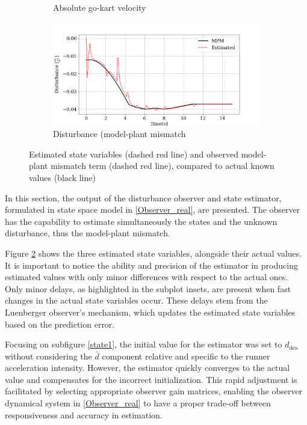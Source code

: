 \documentclass[a4paper,12pt,oneside]{book}
\begin{document}
\begin{figure}[h!]
\begin{subfigure}[b]{0.49\textwidth}
    \caption{Absolute go-kart velocity}
    \end{subfigure}
    \hfill
    \begin{subfigure}[b]{0.49\textwidth}
        \includegraphics[width=\textwidth]{Estimator/mpm.png}
    \caption{Disturbance (model-plant mismatch}
    \label{disturbance}
    \end{subfigure}
    \caption{Estimated state variables (dashed red line) and observed model-plant mismatch term (dashed red line), compared to actual known values (black line)}
\label{Estimator}
\end{figure}

In this section, the output of the disturbance observer and state estimator, formulated in state space model in \eqref{Observer_real}, are presented.
The observer has the capability to estimate simultaneously the states and the unknown disturbance, thus the model-plant mismatch.

Figure \ref{Estimator} shows the three estimated state variables, alongside their actual values.
It is important to notice the ability and precision of the estimator in producing estimated values with only minor differences with respect to the actual ones.
Only minor delays, as highlighted in the subplot insets, are present when fast changes in the actual state variables occur.
These delays stem from the Luenberger observer's mechanism, which updates the estimated state variables based on the prediction error.

Focusing on subfigure \ref{state1}, the initial value for the estimator was set to $d_\text{des}$ without considering the $\bar{d}$ component relative and specific to the runner acceleration intensity. 
However, the estimator quickly converges to the actual value and compensates for the incorrect initialization. 
This rapid adjustment is facilitated by selecting appropriate observer gain matrices, enabling the observer dynamical system in \eqref{Observer_real} to have a proper trade-off between responsiveness and accuracy in estimation.
\end{document}
